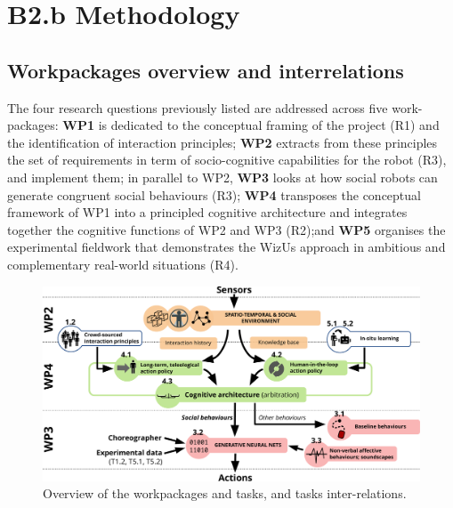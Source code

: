 \documentclass[11pt,a4paper]{report}
\newcommand{\project}{WizUs\xspace}
\newcommand{\eu}[1]{}
\begin{document}


{\let\clearpage\relax\chapter{B2.b Methodology}\label{research-methodology}} %

\eu{Describe the proposed methodology in detail including any key intermediate
goals. Explain and justify the methodology in relation to the state of the art,
and particularly novel or unconventional aspects addressing the
'high-risk/high-gain' balance. Highlight any intermediate stages where results
may require adjustments to the project planning. In case you ask that team
members are engaged by another host institution their participation has to be
fully justified by the scientific added value they bring to the project.}


\section{Workpackages overview and interrelations}\label{workpackage-interrelations}


The four research questions previously listed are addressed across five
work-packages: \textbf{WP1} is dedicated to the conceptual framing of the
project (R1) and the identification of interaction principles; \textbf{WP2}
extracts from these principles the set of requirements in term of
socio-cognitive capabilities for the robot (R3), and implement them; in parallel
to WP2,  \textbf{WP3} looks at how social robots can generate congruent social
behaviours (R3); \textbf{WP4} transposes the conceptual framework of WP1 into a
principled cognitive architecture and integrates together the cognitive
functions of WP2 and WP3 (R2);and \textbf{WP5} organises the experimental
fieldwork that demonstrates the \project approach in ambitious and complementary
real-world situations (R4).



\begin{figure}[h!]
\centering
\includegraphics[width=\linewidth]{figs/archi}
\caption{Overview of the workpackages and tasks, and tasks inter-relations.}
\label{fig:archi}
\end{figure}
\end{document}
